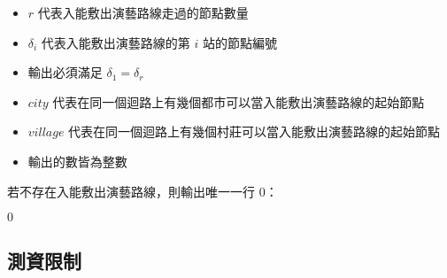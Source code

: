 \begin{itemize}
\tightlist
\item
  \begin{math}r\end{math} 代表入能敷出演藝路線走過的節點數量
\item
  \begin{math}\delta_i\end{math} 代表入能敷出演藝路線的第
  \begin{math}i\end{math} 站的節點編號
\item
  輸出必須滿足 \begin{math}\delta_1 = \delta_r\end{math}
\item
  \begin{math}city\end{math}
  代表在同一個迴路上有幾個都市可以當入能敷出演藝路線的起始節點
\item
  \begin{math}village\end{math}
  代表在同一個迴路上有幾個村莊可以當入能敷出演藝路線的起始節點
\item
  輸出的數皆為整數
\end{itemize}

若不存在入能敷出演藝路線，則輸出唯一一行 \begin{math}0\end{math}：

\begin{format}
\f{
$0$
}
\end{format}

\subsection{測資限制}

